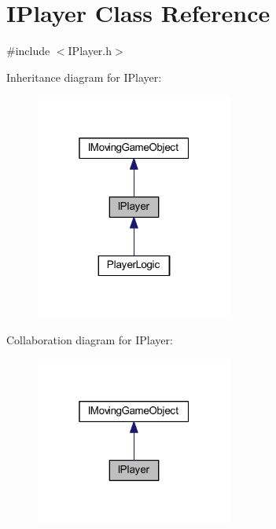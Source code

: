 \hypertarget{class_i_player}{}\section{I\+Player Class Reference}
\label{class_i_player}


{\ttfamily \#include $<$I\+Player.\+h$>$}



Inheritance diagram for I\+Player\+:\nopagebreak
\begin{figure}[H]
\begin{center}
\leavevmode
\includegraphics[width=184pt]{class_i_player__inherit__graph}
\end{center}
\end{figure}


Collaboration diagram for I\+Player\+:\nopagebreak
\begin{figure}[H]
\begin{center}
\leavevmode
\includegraphics[width=184pt]{class_i_player__coll__graph}
\end{center}
\end{figure}
